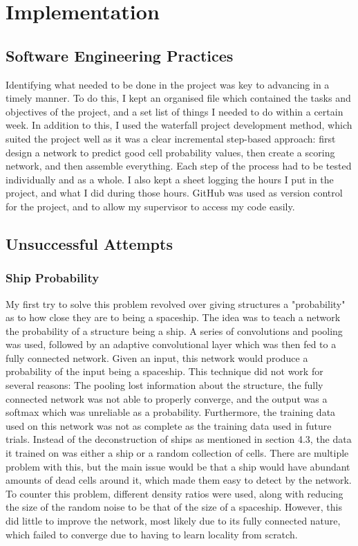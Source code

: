 \documentclass{l4proj}
\begin{document}
\chapter{Implementation}

\section{Software Engineering Practices}

Identifying what needed to be done in the project was key to advancing in a timely manner. To do this, I kept an organised file which contained the tasks and objectives of the project, and a set list of things I needed to do within a certain week. In addition to this, I used the waterfall project development method, which suited the project well as it was a clear incremental step-based approach: first design a network to predict good cell probability values, then create a scoring network, and then assemble everything. Each step of the process had to be tested individually and as a whole. I also kept a sheet logging the hours I put in the project, and what I did during those hours. GitHub was used as version control for the project, and to allow my supervisor to access my code easily.

\section {Unsuccessful Attempts}

\subsection{Ship Probability}

My first try to solve this problem revolved over giving structures a "probability" as to how close they are to being a spaceship. The idea was to teach a network the probability of a structure being a ship. A series of convolutions and pooling was used, followed by an adaptive convolutional layer which was then fed to a fully connected network. Given an input, this network would produce a probability of the input being a spaceship. This technique did not work for several reasons: The pooling lost information about the structure, the fully connected network was not able to properly converge, and the output was a softmax which was unreliable as a probability. Furthermore, the training data used on this network was not as complete as the training data used in future trials. Instead of the deconstruction of ships as mentioned in section 4.3, the data it trained on was either a ship or a random collection of cells. There are multiple problem with this, but the main issue would be that a ship would have abundant amounts of dead cells around it, which made them easy to detect by the network. To counter this problem, different density ratios were used, along with reducing the size of the random noise to be that of the size of a spaceship. However, this did little to improve the network, most likely due to its fully connected nature, which failed to converge due to having to learn locality from scratch.
\end{document}
